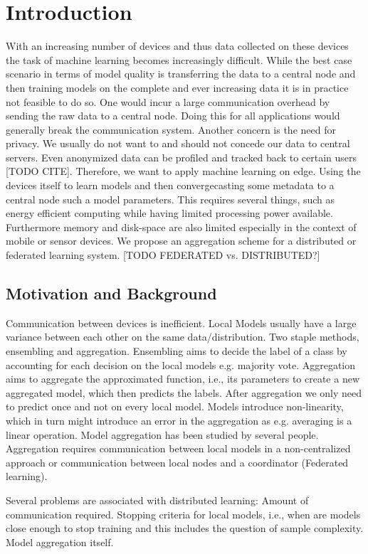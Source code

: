 \chapter{Introduction}
With an increasing number of devices and thus data collected on these devices the task of machine learning becomes increasingly difficult.
While the best case scenario in terms of model quality is transferring the data to a central node and then training models on the complete and ever increasing data it is in practice not feasible to do so.
One would incur a large communication overhead by sending the raw data to a central node. 
Doing this for all applications would generally break the communication system. 
Another concern is the need for privacy. We usually do not want to and should not concede our data to central servers.
Even anonymized data can be profiled and tracked back to certain users [TODO CITE].
Therefore, we want to apply machine learning on edge.
Using the devices itself to learn models and then convergecasting some metadata to a central node such a model parameters.
This requires several things, such as energy efficient computing while having limited processing power available.
Furthermore memory and disk-space are also limited especially in the context of mobile or sensor devices.
We propose an aggregation scheme for a distributed or federated learning system. [TODO FEDERATED vs. DISTRIBUTED?]

\section{Motivation and Background}
Communication between devices is inefficient.
Local Models usually have a large variance between each other on the same data/distribution.
Two staple methods, ensembling and aggregation.
Ensembling aims to decide the label of a class by accounting for each decision on the local models e.g. majority vote.
Aggregation aims to aggregate the approximated function, i.e., its parameters to create a new aggregated model, which then predicts the labels.
After aggregation we only need to predict once and not on every local model.
Models introduce non-linearity, which in turn might introduce an error in the aggregation as e.g. averaging is a linear operation.
Model aggregation has been studied by several people.
Aggregation requires communication between local models in a non-centralized approach or communication between local nodes and a coordinator (Federated learning).

Several problems are associated with distributed learning:
Amount of communication required.
Stopping criteria for local models, i.e., when are models close enough to stop training and this includes the question of sample complexity.
Model aggregation itself.



